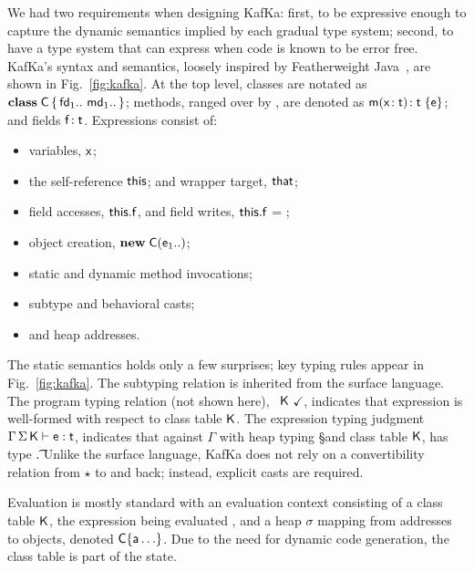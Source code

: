 \documentclass[a4paper,USenglish]{lipics-v2018}
\newcommand{\EM}[1]{\ensuremath{#1}\xspace}
\newcommand{\xt}[1]{{\sf{#1}}}
\newcommand{\bt}[1]{\xt{\bf #1}}
\newcommand{\EMxt}[1]{\EM{\xt{#1}}}
\newcommand{\x}{\EMxt x}
\newcommand{\m}{\EMxt m}
\newcommand{\s}{\EM{\sigma}}
\newcommand{\K}{\EMxt K}
\newcommand{\Env}{\EM{\Gamma}}
\newcommand{\any}{\EM{\star}}
\newcommand{\this}{\EMxt{this}}
\newcommand{\that}{\EMxt{that}}
\newcommand{\FRead}[1]{\EM{\this.#1}}
\newcommand{\FWrite}[2]{\EM{\this.#1} = #2}
\newcommand{\New}[2]{\EM{\new\;#1(#2)}}
\newcommand{\new}{\EM{\bt{new}}}
\newcommand{\HT}[2]{\EM{{#1}\!:{#2}}}
\newcommand{\Mdef}[5]{\EM{ \HT{ #1( \HT{#2}{#3})}{#4}\;\{{#5}\}}}
\newcommand{\Class}[3]{\EM{\bt{class}\;#1\,\{\,#2~#3\,\}}}
\newcommand{\Fdef}[2]{\EM{ \HT{#1}{#2} }}
\newcommand{\OK}{\EM{~\checkmark}}
\newcommand{\EnvType}[5]{ \EM{#1\,#2\,#3\vdash #4 : #5}}
\newcommand{\WFp}[2]{#1~#2\OK}
\newcommand{\figref}[1]{Fig.~\ref{#1}\xspace}
\newcommand{\kafka}{{\sf KafKa}\xspace}
\newcounter{rules}
\newcounter{conds}
\newcounter{cond}[conds]
\begin{document}
We had two requirements when designing \kafka: first, to be expressive enough to
capture the dynamic semantics implied by each gradual type system; second,
to have a type system that can express when code is known to be error
free. \kafka's syntax and semantics, loosely inspired by Featherweight
Java~\cite{FJ}, are shown in \figref{fig:kafka}. At the top level, classes
are notated as \Class\C{\fd[1]..}{\md[1]..}; methods, ranged over by \md,
are denoted as \Mdef\m\x\t\t\e; and fields \Fdef\f\t. Expressions consist
of:
\begin{itemize}
\item variables, \x;
\item the self-reference \this; and wrapper target, \that;
\item field accesses, \FRead\f, and field writes, \FWrite\f\e;
\item object creation, \New\C{\e[1]..};
\item static and dynamic method invocations;
\item subtype and behavioral casts;
\item and heap addresses.
\end{itemize}
The static semantics holds only a few surprises; key typing rules appear in
\figref{fig:kafka}. The subtyping relation is inherited from the surface
language. The program typing relation (not shown here), \WFp\e\K, indicates
that expression \e is well-formed with respect to class table \K. The
expression typing judgment $\EnvType \Env\S\K\e\t$, indicates that against
\Env with heap typing \S and class table \K, \e has type \t. Unlike the
surface language, \kafka does not rely on a convertibility relation from
\any to \C and back; instead, explicit casts are required.

Evaluation is mostly standard with an evaluation context consisting of a
class table \K, the expression being evaluated \e, and a heap \s mapping
from addresses \a to objects, denoted $\C\{\a\ldots\}$. Due to the need for
dynamic code generation, the class table is part of the state.

\renewcommand{\S}{\EM{\Sigma}\xspace}
\end{document}
